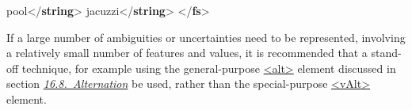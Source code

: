 \begin{shaded}
\hspace*{1em}\hspace*{1em}\hspace*{1em}pool{</\textbf{string}>}\mbox{}\newline 
\hspace*{1em}\hspace*{1em}\hspace*{1em}jacuzzi{</\textbf{string}>}\mbox{}\newline 
\hspace*{1em}\hspace*{1em}\mbox{}\newline 
\hspace*{1em}\mbox{}\newline 
{}\mbox{}\newline 
{</\textbf{fs}>}\end{shaded}\egroup\par \par
If a large number of ambiguities or uncertainties need to be represented, involving a relatively small number of features and values, it is recommended that a stand-off technique, for example using the general-purpose \hyperref[TEI.alt]{<alt>} element discussed in section \textit{\hyperref[SAAT]{16.8.\ Alternation}}  be used, rather than the special-purpose \hyperref[TEI.vAlt]{<vAlt>} element.
